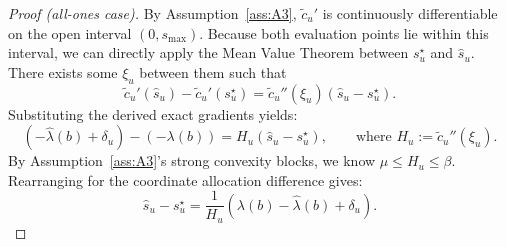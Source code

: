\documentclass[11pt]{article}
\newcommand{\1}{\mathbf{1}}
\begin{document}
\begin{proof}[Proof (all-ones case)]
  By Assumption~\ref{ass:A3}, $\tilde{c}_u'$ is continuously differentiable on the open interval $(0, s_{\max})$. Because both evaluation points lie within this interval, we can directly apply the Mean Value Theorem between $s_u^{\star}$ and $\hat{s}_u$.
  There exists some $\xi_u$ between them such that
  \begin{equation*}
    \tilde{c}_u'(\hat{s}_u) - \tilde{c}_u'(s_u^{\star}) = \tilde{c}_u''(\xi_u)(\hat{s}_u - s_u^{\star}).
  \end{equation*}
  Substituting the derived exact gradients yields:
  \begin{equation*}
    (-\hat{\lambda}(b) + \delta_u) - (-\lambda(b)) = H_u (\hat{s}_u - s_u^{\star}), \qquad \text{where } H_u := \tilde{c}_u''(\xi_u).
  \end{equation*}
  By Assumption~\ref{ass:A3}'s strong convexity blocks, we know $\mu \leq H_u \leq \beta$.
  Rearranging for the coordinate allocation difference gives:
  \begin{equation}
    \label{eq:mvt-coordinate-diff}
    \hat{s}_u - s_u^{\star} = \frac{1}{H_u} (\lambda(b) - \hat{\lambda}(b) + \delta_u).
  \end{equation}


\end{proof}
\end{document}
